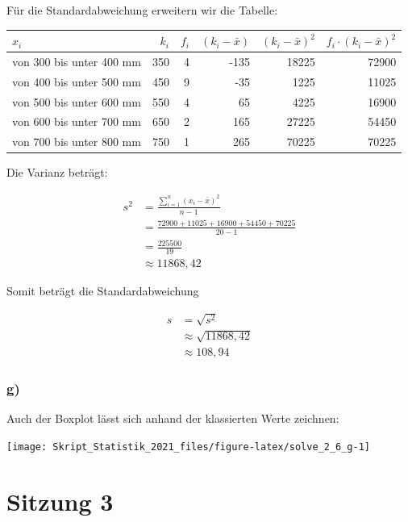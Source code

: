 \documentclass[
  11pt,
  ngerman,
  a4paper,
]{report}
\begin{document}
Für die Standardabweichung erweitern wir die Tabelle:

\begin{table}[H]
\centering
\begin{tabular}{lrrrrr}
\toprule
$x_i$ & $k_i$ & $f_i$ & $(k_i - \bar{x})$ & $(k_i - \bar{x})^2$ & $f_i \cdot (k_i - \bar{x})^2$\\
\midrule
von 300 bis unter 400 mm & 350 & 4 & -135 & 18225 & 72900\\
von 400 bis unter 500 mm & 450 & 9 & -35 & 1225 & 11025\\
von 500 bis unter 600 mm & 550 & 4 & 65 & 4225 & 16900\\
von 600 bis unter 700 mm & 650 & 2 & 165 & 27225 & 54450\\
von 700 bis unter 800 mm & 750 & 1 & 265 & 70225 & 70225\\
\bottomrule
\end{tabular}
\end{table}

Die Varianz beträgt:

\[\begin{aligned}
  s^2&=\frac{\sum\limits_{i=1}^{n}(x_{i}-\bar{x})^2}{n-1} \\
     &=\frac{72900+11025+16900+54450+70225}{20-1}\\
     &=\frac{225500}{19}\\
     &\approx{11868{,}42}
\end{aligned}\]

Somit beträgt die Standardabweichung

\[\begin{aligned}
  s&=\sqrt{s^2}\\
   &\approx\sqrt{11868{,}42}\\
   &\approx108{,}94
\end{aligned}\]

\hypertarget{g}{%
\subsubsection{g)}\label{g}}

Auch der Boxplot lässt sich anhand der klassierten Werte zeichnen:

\begin{center}\texttt{[image: Skript\_Statistik\_2021\_files/figure-latex/solve\_2\_6\_g-1]} \end{center}

\hypertarget{sitzung-3}{%
\section*{Sitzung 3}\label{sitzung-3}}
\end{document}
